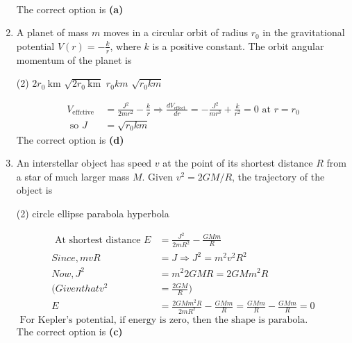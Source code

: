 \begin{enumerate}
\begin{answer}
\begin{align*}
	\end{align*}
	The correct option is \textbf{(a)}
\end{answer}
	\item A planet of mass $m$ moves in a circular orbit of radius $r_{0}$ in the gravitational potential $V(r)=-\frac{k}{r}$, where $k$ is a positive constant. The orbit angular momentum of the planet is
	{}
\begin{tasks}(2)
	\task[\textbf{A.}] $2 r_{0} \mathrm{~km}$
	\task[\textbf{B.}]$\sqrt{2 r_{0} \mathrm{~km}}$
	\task[\textbf{C.}]$r_{0} k m$
	\task[\textbf{D.}]$\sqrt{r_{0} k m}$
\end{tasks}
\begin{answer}
\begin{align*}
	V_{\text {effctive }}&=\frac{J^{2}}{2 m r^{2}}-\frac{k}{r} \Rightarrow \frac{d V_{\text {effect }}}{d r}=-\frac{J^{2}}{m r^{3}}+\frac{k}{r^{2}}=0 \text { at } r=r_{0}\\
\text { so } J&=\sqrt{r_{0} k m}
\end{align*}
The correct option is \textbf{(d)}	
\end{answer}
	\item An interstellar object has speed $v$ at the point of its shortest distance $R$ from a star of much larger mass $M$. Given $v^{2}=2 G M / R$, the trajectory of the object is
	{}
\begin{tasks}(2)
	\task[\textbf{A.}] circle
	\task[\textbf{B.}]ellipse
	\task[\textbf{C.}]parabola
	\task[\textbf{D.}]hyperbola
\end{tasks}
\begin{answer}
	\begin{align*}
	\text { At shortest distance } E&=\frac{J^{2}}{2 m R^{2}}-\frac{G M m}{R}\\
	Since, m v R&=J \Rightarrow J^{2}=m^{2} v^{2} R^{2}\\
	Now, J^{2}&=m^{2} 2 G M R=2 G M m^{2} R\\
	(Given that v^{2}&=\frac{2 G M}{R} )\\
	E&=\frac{2 G M m^{2} R}{2 m R^{2}}-\frac{G M m}{R}=\frac{G M m}{R}-\frac{G M m}{R}=0	
	\end{align*}
	$\text { For Kepler's potential, if energy is zero, then the shape is parabola. }$\\
	The correct option is \textbf{(c)}
\end{answer}

\end{enumerate}
